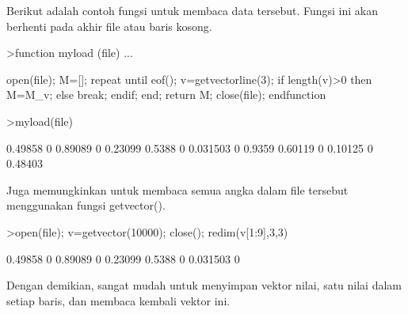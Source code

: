 \documentclass[12pt,arial,letterpaper]{book}
\begin{document}
\begin{eulercomment}
\begin{eulercomment}
\begin{eulercomment}
\begin{eulercomment}
\begin{eulercomment}
\begin{eulercomment}
\begin{eulercomment}
\begin{eulercomment}
\begin{eulercomment}
\begin{eulercomment}
\begin{eulercomment}
\begin{eulercomment}
\begin{eulercomment}
\begin{eulercomment}
\begin{eulercomment}
\begin{eulercomment}
\begin{eulercomment}
\begin{eulercomment}
\begin{eulercomment}
\begin{eulercomment}
\begin{eulercomment}
\begin{eulercomment}
\begin{eulercomment}
\begin{eulercomment}
\begin{eulercomment}
\begin{eulercomment}
\begin{eulercomment}
\begin{eulercomment}
\begin{eulercomment}
\begin{eulercomment}
\begin{eulercomment}
\begin{eulercomment}
\begin{eulercomment}
\begin{eulercomment}
\begin{eulercomment}
\begin{eulercomment}
\begin{eulercomment}
\begin{eulercomment}
\begin{eulercomment}
Berikut adalah contoh fungsi untuk membaca data tersebut. Fungsi ini
akan berhenti pada akhir file atau baris kosong.
\end{eulercomment}
\begin{eulerprompt}
>function myload (file) ...
\end{eulerprompt}
\begin{eulerudf}
  open(file);
  M=[];
  repeat
     until eof();
     v=getvectorline(3);
     if length(v)>0 then M=M_v; else break; endif;
  end;
  return M;
  close(file);
  endfunction
\end{eulerudf}
\begin{eulerprompt}
>myload(file)
\end{eulerprompt}
\begin{euleroutput}
    0.49858         0   0.89089         0   0.23099 
     0.5388         0  0.031503         0    0.9359 
    0.60119         0   0.10125         0   0.48403 
\end{euleroutput}
\begin{eulercomment}
Juga memungkinkan untuk membaca semua angka dalam file tersebut
menggunakan fungsi getvector().
\end{eulercomment}
\begin{eulerprompt}
>open(file); v=getvector(10000); close(); redim(v[1:9],3,3)
\end{eulerprompt}
\begin{euleroutput}
    0.49858         0   0.89089 
          0   0.23099    0.5388 
          0  0.031503         0 
\end{euleroutput}
\begin{eulercomment}
Dengan demikian, sangat mudah untuk menyimpan vektor nilai, satu nilai
dalam setiap baris, dan membaca kembali vektor ini.

\end{eulercomment}
\end{eulercomment}
\end{eulercomment}
\end{eulercomment}
\end{eulercomment}
\end{eulercomment}
\end{eulercomment}
\end{eulercomment}
\end{eulercomment}
\end{eulercomment}
\end{eulercomment}
\end{eulercomment}
\end{eulercomment}
\end{eulercomment}
\end{eulercomment}
\end{eulercomment}
\end{eulercomment}
\end{eulercomment}
\end{eulercomment}
\end{eulercomment}
\end{eulercomment}
\end{eulercomment}
\end{eulercomment}
\end{eulercomment}
\end{eulercomment}
\end{eulercomment}
\end{eulercomment}
\end{eulercomment}
\end{eulercomment}
\end{eulercomment}
\end{eulercomment}
\end{eulercomment}
\end{eulercomment}
\end{eulercomment}
\end{eulercomment}
\end{eulercomment}
\end{eulercomment}
\end{eulercomment}
\end{eulercomment}
\end{document}
